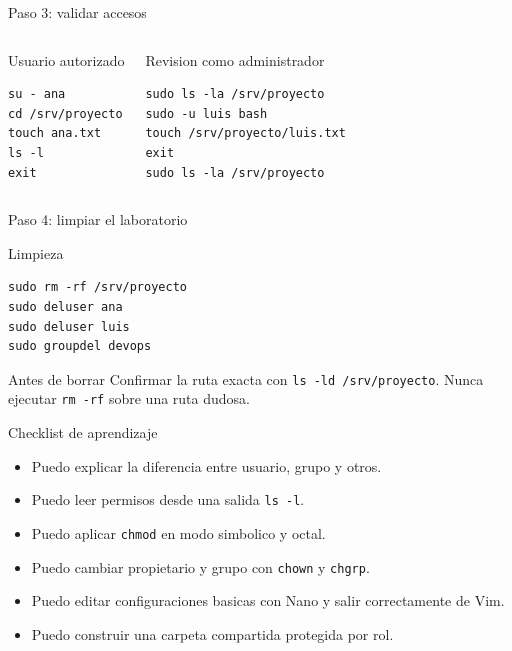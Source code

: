 \documentclass[aspectratio=169]{beamer}
\begin{document}
\begin{frame}[fragile]{Paso 3: validar accesos}
  \begin{columns}[t]
    \begin{block}{Usuario autorizado}
\begin{verbatim}
su - ana
cd /srv/proyecto
touch ana.txt
ls -l
exit
\end{verbatim}
    \end{block}
    \begin{block}{Revision como administrador}
\begin{verbatim}
sudo ls -la /srv/proyecto
sudo -u luis bash
touch /srv/proyecto/luis.txt
exit
sudo ls -la /srv/proyecto
\end{verbatim}
    \end{block}
  \end{columns}
\end{frame}

\begin{frame}[fragile]{Paso 4: limpiar el laboratorio}
  \begin{exampleblock}{Limpieza}
\begin{verbatim}
sudo rm -rf /srv/proyecto
sudo deluser ana
sudo deluser luis
sudo groupdel devops
\end{verbatim}
  \end{exampleblock}
  \vfill
  \begin{alertblock}{Antes de borrar}
    \small Confirmar la ruta exacta con \texttt{ls -ld /srv/proyecto}. Nunca ejecutar \texttt{rm -rf} sobre una ruta dudosa.
  \end{alertblock}
\end{frame}

\begin{frame}{Checklist de aprendizaje}
  \begin{itemize}
    \item Puedo explicar la diferencia entre usuario, grupo y otros.
    \item Puedo leer permisos desde una salida \texttt{ls -l}.
    \item Puedo aplicar \texttt{chmod} en modo simbolico y octal.
    \item Puedo cambiar propietario y grupo con \texttt{chown} y \texttt{chgrp}.
    \item Puedo editar configuraciones basicas con Nano y salir correctamente de Vim.
    \item Puedo construir una carpeta compartida protegida por rol.
  \end{itemize}
\end{frame}
\end{document}
